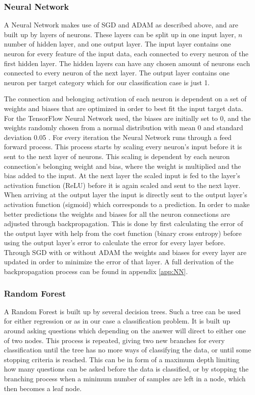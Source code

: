 \documentclass[11pt]{article}
\begin{document}
\subsubsection*{Neural Network}
A Neural Network makes use of SGD and ADAM as described above, and are built up by layers of neurons. These layers can be split up in one input layer, $n$ number of hidden layer, and one output layer. The input layer contains one neuron for every feature of the input data, each connected to every neuron of the first hidden layer. The hidden layers can have any chosen amount of neurons each connected to every neuron of the next layer. The output layer contains one neuron per target category which for our classification case is just 1.

The connection and belonging activation of each neuron is dependent on a set of weights and biases that are optimized in order to best fit the input target data. For the TensorFlow Neural Network used, the biases are initially set to 0, and the weights randomly chosen from a normal distribution with mean 0 and standard deviation 0.05 \cite{tf}. For every iteration the Neural Network runs through a feed forward process. This process starts by scaling every neuron's input before it is sent to the next layer of neurons. This scaling is dependent by each neuron connection's belonging weight and bias, where the weight is multiplied and the bias added to the input. At the next layer the scaled input is fed to the layer's activation function (ReLU) before it is again scaled and sent to the next layer. When arriving at the output layer the input is directly sent to the output layer's activation function (sigmoid) which corresponds to a prediction. In order to make better predictions the weights and biases for all the neuron connections are adjusted through backpropagation. This is done by first calculating the error of the output layer with help from the cost function (binary cross entropy) before using the output layer's error to calculate the error for every layer before.  Through SGD with or without ADAM the weights and biases for every layer are updated in order to minimize the error of that layer. A full derivation of the backpropagation process can be found in appendix \ref{app:NN}.
\subsubsection*{Random Forest}
A Random Forest is built up by several decision trees. Such a tree can be used for either regression or as in our case a classification problem. It is built up around asking questions which depending on the answer will direct to either one of two nodes. This process is repeated, giving two new branches for every classification until the tree has no more ways of classifying the data, or until some stopping criteria is reached. This can be in form of a maximum depth limiting how many questions can be asked before the data is classified, or by stopping the branching process when a minimum number of samples are left in a node, which then becomes a leaf node.
\end{document}
